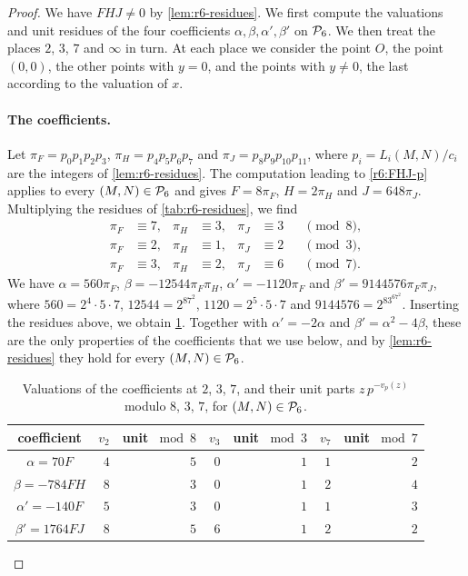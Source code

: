 \begin{proof}
We have $FHJ\ne0$ by \cref{lem:r6-residues}. We first compute the valuations and unit residues of the four coefficients $\alpha,\beta,\alpha',\beta'$ on $\mathcal P_6$. We then treat the places $2$, $3$, $7$ and $\infty$ in turn. At each place we consider the point $O$, the point $(0,0)$, the other points with $y=0$, and the points with $y\ne0$, the last according to the valuation of $x$.

\paragraph{The coefficients.} Let $\pi_F=p_0p_1p_2p_3$, $\pi_H=p_4p_5p_6p_7$ and $\pi_J=p_8p_9p_{10}p_{11}$, where $p_i=L_i(M,N)/c_i$ are the integers of \cref{lem:r6-residues}. The computation leading to \eqref{r6:FHJ-p} applies to every $(M,N)\in\mathcal P_6$ and gives $F=8\pi_F$, $H=2\pi_H$ and $J=648\pi_J$. Multiplying the residues of \cref{tab:r6-residues}, we find
\[
\begin{aligned}
\pi_F&\equiv7,& \pi_H&\equiv3,& \pi_J&\equiv3 &&\pmod 8,\\
\pi_F&\equiv2,& \pi_H&\equiv1,& \pi_J&\equiv2 &&\pmod 3,\\
\pi_F&\equiv3,& \pi_H&\equiv2,& \pi_J&\equiv6 &&\pmod 7.
\end{aligned}
\]
We have $\alpha=560\pi_F$, $\beta=-12544\pi_F\pi_H$, $\alpha'=-1120\pi_F$ and $\beta'=9144576\pi_F\pi_J$, where $560=2^4\cdot5\cdot7$, $12544=2^87^2$, $1120=2^5\cdot5\cdot7$ and $9144576=2^83^67^2$. Inserting the residues above, we obtain \cref{tab:r6-coeffs}. Together with $\alpha'=-2\alpha$ and $\beta'=\alpha^2-4\beta$, these are the only properties of the coefficients that we use below, and by \cref{lem:r6-residues} they hold for every $(M,N)\in\mathcal P_6$.

\begin{table}[htbp]
\centering
\caption{Valuations of the coefficients at $2$, $3$, $7$, and their unit parts $z\,p^{-v_p(z)}$ modulo $8$, $3$, $7$, for $(M,N)\in\mathcal P_6$.}
\label{tab:r6-coeffs}
\begin{tabular}{crrrrrr}
\toprule
coefficient & $v_2$ & unit $\bmod 8$ & $v_3$ & unit $\bmod 3$ & $v_7$ & unit $\bmod 7$\\
\midrule
$\alpha=70F$ & $4$ & $5$ & $0$ & $1$ & $1$ & $2$\\
$\beta=-784FH$ & $8$ & $3$ & $0$ & $1$ & $2$ & $4$\\
$\alpha'=-140F$ & $5$ & $3$ & $0$ & $1$ & $1$ & $3$\\
$\beta'=1764FJ$ & $8$ & $5$ & $6$ & $1$ & $2$ & $2$\\
\bottomrule
\end{tabular}
\end{table}


\end{proof}
